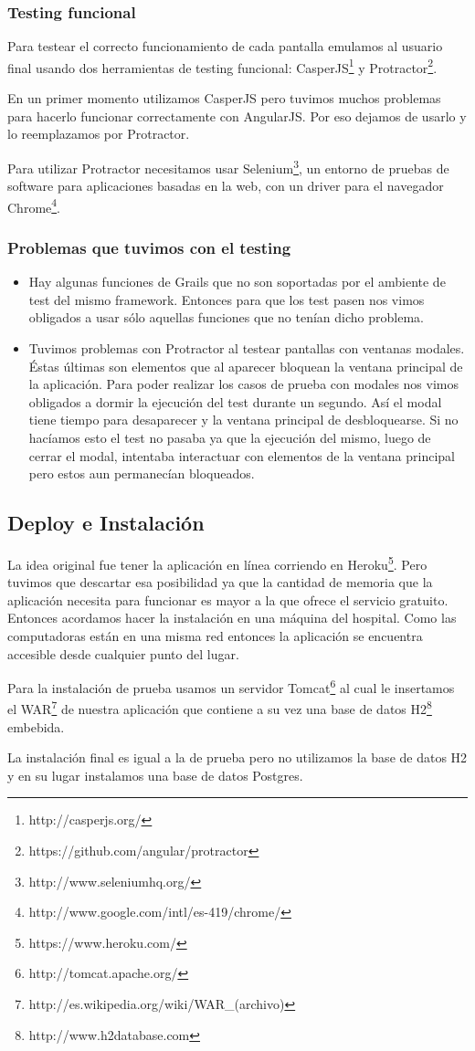 \subsubsection{Testing funcional}
Para testear el correcto funcionamiento de cada pantalla emulamos al usuario final usando dos herramientas de testing funcional: CasperJS\footnote{http://casperjs.org/} y Protractor\footnote{https://github.com/angular/protractor}.

En un primer momento utilizamos CasperJS pero tuvimos muchos problemas para hacerlo funcionar correctamente con AngularJS. Por eso dejamos de usarlo y lo reemplazamos por Protractor.

Para utilizar Protractor necesitamos usar Selenium\footnote{http://www.seleniumhq.org/}, un entorno de pruebas de software para aplicaciones basadas en la web, con un driver para el navegador  Chrome\footnote{http://www.google.com/intl/es-419/chrome/}.

\subsubsection{Problemas que tuvimos con el testing}
\begin{itemize}
\item Hay algunas funciones de Grails que no son soportadas por el ambiente de test del mismo framework. Entonces para que los test pasen nos vimos obligados a usar sólo aquellas funciones que no tenían dicho problema.
\item Tuvimos problemas con Protractor al testear pantallas con ventanas modales. Éstas últimas son elementos que al aparecer bloquean la ventana principal de la aplicación. Para poder realizar los casos de prueba con modales nos vimos obligados a dormir la ejecución del test durante un segundo. Así el modal tiene tiempo para desaparecer y la ventana principal de desbloquearse. Si no hacíamos esto el test no pasaba ya que la ejecución del mismo, luego de cerrar el modal, intentaba interactuar con elementos de la ventana principal pero estos aun permanecían bloqueados.
\end{itemize}
\subsection{Deploy e Instalación}
La idea original fue tener la aplicación en línea corriendo en Heroku\footnote{https://www.heroku.com/}. Pero tuvimos que descartar esa posibilidad ya que la cantidad de memoria que la aplicación necesita para funcionar es mayor a la que ofrece el servicio gratuito. Entonces acordamos hacer la instalación en una máquina del hospital. Como las computadoras están en una misma red entonces la aplicación se encuentra accesible desde cualquier punto del lugar.

Para la instalación de prueba usamos un servidor Tomcat\footnote{http://tomcat.apache.org/} al cual le insertamos el WAR\footnote{http://es.wikipedia.org/wiki/WAR\_(archivo)} de nuestra aplicación que contiene a su vez una base de datos H2\footnote{http://www.h2database.com} embebida.

La instalación final es igual a la de prueba pero no utilizamos la base de datos H2 y en su lugar instalamos una base de datos Postgres.
